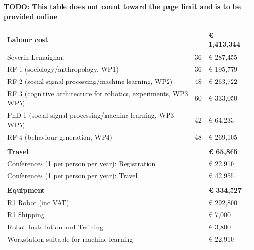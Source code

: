 \documentclass[11pt,a4paper]{report}
\newcommand{\TODO}[1]{{\color{red}\textbf{TODO: #1}}}
\begin{document}
\TODO{This table does not count toward the page limit and is to be provided online}
\begin{table}[]
\begin{tabular}{@{}lll@{}}
\toprule
\textbf{Labour cost}                                             & \textbf{} & \textbf{€ 1,413,344} \\ \midrule
Severin Lemaignan                                                & 36        & € 287,455            \\
RF 1 (sociology/anthropology, WP1)                               & 36        & € 195,779            \\
RF 2 (social signal processing/machine learning, WP2)            & 48        & € 263,722            \\
RF 3 (cognitive architecture for robotics, experiments, WP3 WP5) & 60        & € 333,050            \\
PhD 1 (social signal processing/machine learning, WP3 WP5)       & 42        & € 64,233             \\
RF 4 (behaviour generation, WP4)                                 & 48        & € 269,105            \\
                                                                 &           &                      \\
\textbf{Travel}                                                  & \textbf{} & \textbf{€ 65,865}    \\ \midrule
Conferences (1 per person per year): Registration                &           & € 22,910             \\
Conferences (1 per person per year): Travel                      &           & € 42,955             \\
                                                                 &           &                      \\
\textbf{Equipment}                                               & \textbf{} & \textbf{€ 334,527}   \\ \midrule
R1 Robot (inc VAT)                                               &           & € 292,800            \\
R1 Shipping                                                      &           & € 7,000              \\
Robot Installation and Training                                  &           & € 3,800              \\
Workstation suitable for machine learning                        &           & € 22,910             \\

\end{tabular}
\end{table}
\end{document}
